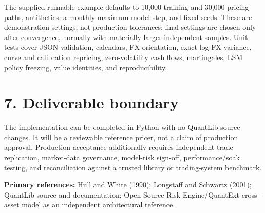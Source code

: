 \documentclass[9pt,letterpaper]{extarticle}
\begin{document}
The supplied runnable example defaults to 10,000 training and 30,000 pricing paths, antithetics, a monthly maximum model step, and fixed seeds. These are demonstration settings, not production tolerances; final settings are chosen only after convergence, normally with materially larger independent samples. Unit tests cover JSON validation, calendars, FX orientation, exact log-FX variance, curve and calibration repricing, zero-volatility cash flows, martingales, LSM policy freezing, value identities, and reproducibility.

\section{7. Deliverable boundary}

The implementation can be completed in Python with no QuantLib source changes. It will be a reviewable reference pricer, not a claim of production approval. Production acceptance additionally requires independent trade replication, market-data governance, model-risk sign-off, performance/soak testing, and reconciliation against a trusted library or trading-system benchmark.

\textbf{Primary references:} Hull and White (1990); Longstaff and Schwartz (2001); QuantLib source and documentation; Open Source Risk Engine/QuantExt cross-asset model as an independent architectural reference.
\end{document}
